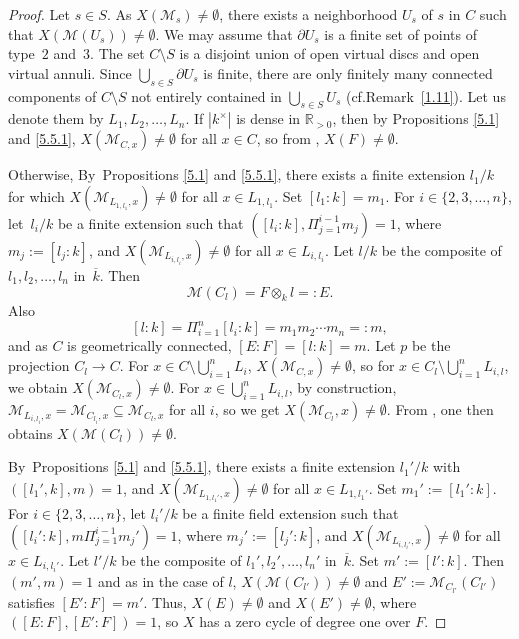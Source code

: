 \documentclass[10pt]{amsart}
\newcommand{\cf}{cf.}
\let\backslash\setminus
\theoremstyle{definition}
\begin{document}
\begin{proof} Let $s \in S$.
As $X(\mathscr{M}_{s}) \neq \emptyset$, there exists a neighborhood $U_s$ of $s$ in $C$ such that ${X(\mathscr{M}(U_s)) \neq \emptyset}$. We may assume that $\partial{U_s}$ is a finite set of points of type~$2$ and~$3$. The set $C \backslash S$ is a disjoint union of open virtual discs and open virtual annuli. Since $\bigcup_{s\in S}\partial{U_s}$ is finite, there are only finitely many connected components of $C \backslash S$ not entirely contained in $\bigcup_{s\in S} U_s$ (\cf Remark~\ref{1.11}). Let us denote them by $L_1,L_2, \dots, L_n$. If $|k^{\times}|$ is dense in $\mathbb{R}_{>0}$, then by Propositions \ref{5.1} and \ref{5.5.1}, $X(\mathscr{M}_{C,x}) \neq \emptyset$ for all $x \in C$, so from \cite[Th.\,3.11]{une}, $X(F) \neq \emptyset$.

Otherwise, By~Propositions \ref{5.1} and \ref{5.5.1}, there exists a finite extension $l_1/k$ for which ${X(\mathscr{M}_{L_{1,l_1},x}) \neq \emptyset}$ for all $x \in L_{1, l_1}$. Set $[l_1:k]=m_1$. For $i \in \{2,3,\dots, n\}$, let~$l_i/k$ be a finite extension such that $([l_i:k], \Pi_{j=1}^{i-1} m_j)=1$, where $m_{j}:=[l_{j}:k]$, and $X(\mathscr{M}_{L_{i,l_i},x}) \neq \emptyset$ for all $x \in L_{i, l_i}$.
Let $l/k$ be the composite of $l_1, l_2, \dots, l_n$ in~$\overline{k}$. Then
\[
\mathscr{M}(C_l)=F \otimes_k l=:E.
\]
Also
\[
{[l:k]=\Pi_{i=1}^n [l_i:k]}=m_1m_2\cdots m_n=:m,
\]
and as $C$ is geometrically connected, $[E:F]=[l:k]=m$. Let $p$ be the projection $C_l \to C$. For $x \in C \backslash \bigcup_{i=1}^n L_i$, $X(\mathscr{M}_{C,x}) \neq \emptyset$, so for $x \in C_l \backslash \bigcup_{i=1}^n L_{i,l}$, we obtain $X(\mathscr{M}_{C_l,x}) \neq \emptyset$. For $x \in \bigcup_{i=1}^n L_{i,l}$, by construction, $\mathscr{M}_{L_{i,l_i},x}=\mathscr{M}_{C_{l_i}, x} \subseteq \mathscr{M}_{C_l,x}$ for all $i$, so we get $X(\mathscr{M}_{C_l},x) \neq \emptyset$. From \cite[Th.\,3.11]{une}, one then obtains ${X(\mathscr{M}(C_l)) \neq \emptyset}$.

By~Propositions \ref{5.1} and \ref{5.5.1}, there exists a finite extension $l_1'/k$ with ${([l_1',k],m)=1}$, and $X(\mathscr{M}_{L_{1, l_1'},x}) \neq \emptyset$ for all $x \in L_{1, l_1'}$. Set $m_1':=[l_1':k]$. For $i \in \{2,3,\dots, n\}$, let $l_i'/k$ be a finite field extension such that $([l_i':k], m\Pi_{j=1}^{i-1} m_j')=1$, where $m_{j}':=[l_{j}':k]$, and $X(\mathscr{M}_{L_{i,l_i'},x}) \neq \emptyset$ for all $x \in L_{i, l_i'}$.
Let $l'/k$ be the composite of $l_1', l_2', \dots, l_n'$ in~$\overline{k}$. Set $m':=[l':k]$. Then $(m', m)=1$ and as in the case of $l$, $X(\mathscr{M}(C_{l'})) \neq \emptyset$ and $E':=\mathscr{M}_{C_{l'}}(C_{l'})$ satisfies $[E':F]=m'$.
Thus, $X(E) \neq \emptyset$ and $X(E') \neq \emptyset$, where $([E:F], [E':F])=1$, so $X$ has a zero cycle of degree one over $F$.
\end{proof}
\end{document}
